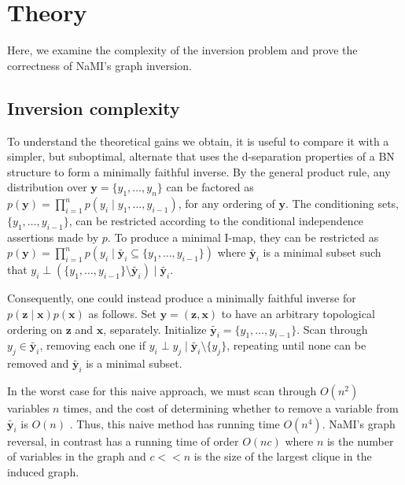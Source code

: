 
\section{Theory}\label{sec:theory}
Here, we examine the complexity of the inversion problem and prove the correctness of NaMI's graph inversion.

\subsection{Inversion complexity}\label{sec:problem-hardness}
To understand the theoretical gains we obtain, it is useful to compare it with a simpler, but suboptimal, alternate that uses the d-separation properties of a BN structure to form a minimally faithful inverse.
By the general product rule, any distribution over $\mathbf{y}=\{y_1,\ldots,y_n\}$ can be factored as
$p(\mathbf{y}) = \prod_{i=1}^np(y_i\mid y_1,\ldots,y_{i-1})$,
for any ordering of $\mathbf{y}$.
The conditioning sets, $\{y_1,\ldots,y_{i-1}\}$, can be restricted according to the conditional independence assertions made by $p$.
To produce a minimal I-map, they can be restricted as
$p(\mathbf{y}) = \prod_{i=1}^np(y_i\mid \tilde{\mathbf{y}_i}\subseteq\{y_1,\ldots,y_{i-1}\})$
where $\tilde{\mathbf{y}_i}$ is a minimal subset such that $y_i\perp(\{y_1,\ldots,y_{i-1}\}\setminus\tilde{\mathbf{y}_i})\mid\tilde{\mathbf{y}_i}$.

Consequently, one could instead produce a minimally faithful inverse for $p(\mathbf{z}\mid\mathbf{x})p(\mathbf{x})$ as follows.
Set $\mathbf{y}=(\mathbf{z},\mathbf{x})$ to have an arbitrary topological ordering on $\mathbf{z}$ and $\mathbf{x}$, separately.
Initialize $\tilde{\mathbf{y}_i}=\{y_1,\ldots,y_{i-1}\}$.
Scan through $y_j\in\tilde{\mathbf{y}_i}$, removing each one if $y_i\perp y_j\mid\tilde{\mathbf{y}_i}\setminus\{y_j\}$, repeating until none can be removed and $\tilde{\mathbf{y}_i}$ is a minimal subset.

In the worst case for this naive approach, we must scan through $O(n^2)$ variables $n$ times, and the cost of determining whether to remove a variable from $\tilde{\mathbf{y}_i}$ is $O(n)$ \citep[Algorithm 3.1]{KollerFriedman2009}.
Thus, this naive method has running time $O(n^4)$.
NaMI's graph reversal, in contrast has a running time of order $O(nc)$ where $n$ is the number of variables in the graph and $c<<n$ is the size of the largest clique in the induced graph.


